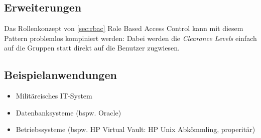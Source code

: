 \subsection*{Erweiterungen}
Das Rollenkonzept von \ref{sec:rbac} Role Based Access Control kann mit diesem Pattern problemlos kompiniert werden: Dabei werden die \emph{Clearance Levels} einfach auf die Gruppen statt direkt auf die Benutzer zugwiesen.

\subsection*{Beispielanwendungen}
\begin{itemize}
	\item Militäreisches IT-System
	\item Datenbanksysteme (bspw. Oracle)
	\item Betriebssysteme (bspw. HP Virtual Vault: HP Unix Abkömmling, properitär)
\end{itemize}